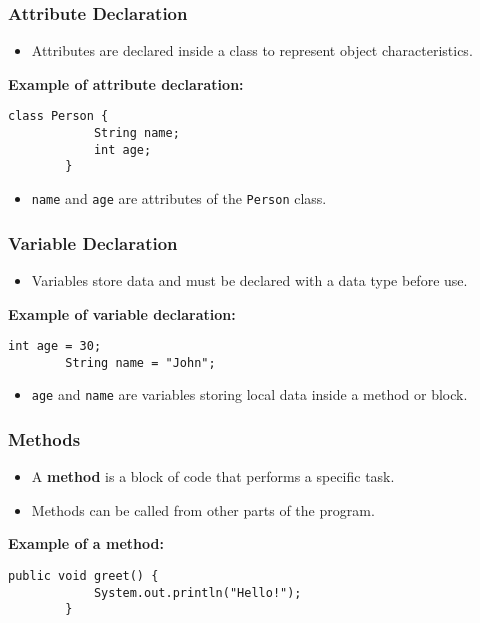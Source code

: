 \documentclass[aspectratio=169, table]{beamer}
\begin{document}
\begin{frame}[fragile]
	\frametitle{Attribute Declaration}
	
	\begin{itemize}
		\item Attributes are declared inside a class to represent object characteristics.
	\end{itemize}
	
	\textbf{Example of attribute declaration:}
	
	\begin{lstlisting}[style=JavaStyle]
		class Person {
			String name;
			int age;
		}
	\end{lstlisting}
	
	\begin{itemize}
		\item \texttt{name} and \texttt{age} are attributes of the \texttt{Person} class.
	\end{itemize}
\end{frame}

\begin{frame}[fragile]
	\frametitle{Variable Declaration }
	
	\begin{itemize}
		\item Variables store data and must be declared with a data type before use.
	\end{itemize}
	
	\textbf{Example of variable declaration:}
	
	\begin{lstlisting}[style=JavaStyle]
		int age = 30;
		String name = "John";
	\end{lstlisting}
	
	\begin{itemize}
		\item \texttt{age} and \texttt{name} are variables storing local data inside a method or block.
	\end{itemize}
\end{frame}

\begin{frame}[fragile]
	\frametitle{Methods }
	
	\begin{itemize}
		\item A \textbf{method} is a block of code that performs a specific task.
		\item Methods can be called from other parts of the program.
	\end{itemize}
	
	\textbf{Example of a method:}
	
	\begin{lstlisting}[style=JavaStyle]
		public void greet() {
			System.out.println("Hello!");
		}
	\end{lstlisting}
\end{frame}
\end{document}
